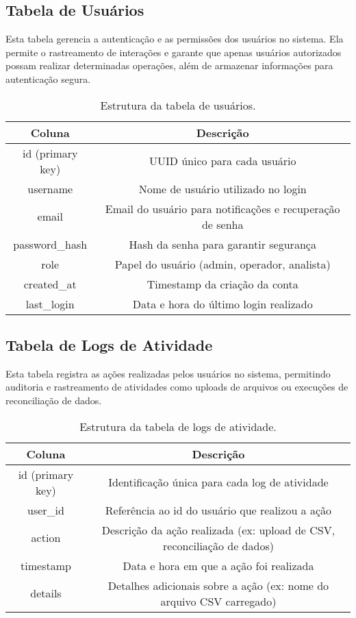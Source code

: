 \subsection{Tabela de Usuários}

Esta tabela gerencia a autenticação e as permissões dos usuários no sistema. Ela permite o rastreamento de interações e garante que apenas usuários autorizados possam realizar determinadas operações, além de armazenar informações para autenticação segura.

\begin{table}[htbp]
    \centering
    \caption{Estrutura da tabela de usuários.}
    \label{Tab:Users}
    \begin{tabular}{|c|c|}
        \hline
        \textbf{Coluna} & \textbf{Descrição} \\ \hline
        id (primary key) & UUID único para cada usuário \\ \hline
        username & Nome de usuário utilizado no login \\ \hline
        email & Email do usuário para notificações e recuperação de senha \\ \hline
        password\_hash & Hash da senha para garantir segurança \\ \hline
        role & Papel do usuário (admin, operador, analista) \\ \hline
        created\_at & Timestamp da criação da conta \\ \hline
        last\_login & Data e hora do último login realizado \\ \hline
    \end{tabular}
\end{table}

\subsection{Tabela de Logs de Atividade}

Esta tabela registra as ações realizadas pelos usuários no sistema, permitindo auditoria e rastreamento de atividades como uploads de arquivos ou execuções de reconciliação de dados.

\begin{table}[htbp]
    \centering
    \caption{Estrutura da tabela de logs de atividade.}
    \label{Tab:ActivityLogs}
    \begin{tabular}{|c|c|}
        \hline
        \textbf{Coluna} & \textbf{Descrição} \\ \hline
        id (primary key) & Identificação única para cada log de atividade \\ \hline
        user\_id & Referência ao id do usuário que realizou a ação \\ \hline
        action & Descrição da ação realizada (ex: upload de CSV, reconciliação de dados) \\ \hline
        timestamp & Data e hora em que a ação foi realizada \\ \hline
        details & Detalhes adicionais sobre a ação (ex: nome do arquivo CSV carregado) \\ \hline
    \end{tabular}
\end{table}

